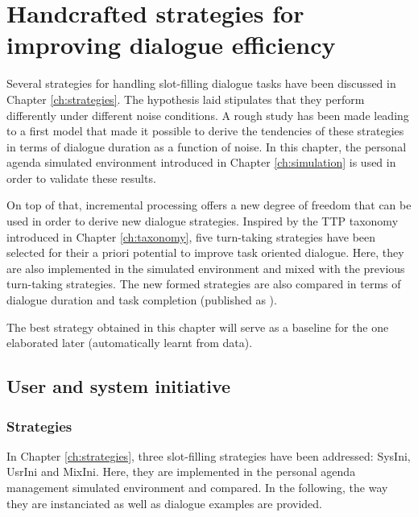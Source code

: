 \chapter{Handcrafted strategies for improving dialogue efficiency}
\label{ch:baseline}

	Several strategies for handling slot-filling dialogue tasks have been discussed in Chapter \ref{ch:strategies}. The hypothesis laid stipulates that they perform differently under different noise conditions. A rough study has been made leading to a first model that made it possible to derive the tendencies of these strategies in terms of dialogue duration as a function of noise. In this chapter, the personal agenda simulated environment introduced in Chapter \ref{ch:simulation} is used in order to validate these results.
	
	On top of that, incremental processing offers a new degree of freedom that can be used in order to derive new dialogue strategies. Inspired by the TTP taxonomy introduced in Chapter \ref{ch:taxonomy}, five turn-taking strategies have been selected for their a priori potential to improve task oriented dialogue. Here, they are also implemented in the simulated environment and mixed with the previous turn-taking strategies. The new formed strategies are also compared in terms of dialogue duration and task completion (published as \cite{Khouzaimi2015a}).
	
	The best strategy obtained in this chapter will serve as a baseline for the one elaborated later (automatically learnt from data).

\section{User and system initiative}
	\subsection{Strategies}
  \label{subsec:strategies}
				
				In Chapter \ref{ch:strategies}, three slot-filling strategies have been addressed: SysIni, UsrIni and MixIni. Here, they are implemented in the personal agenda management simulated environment and compared. In the following, the way they are instanciated as well as dialogue examples are provided.

